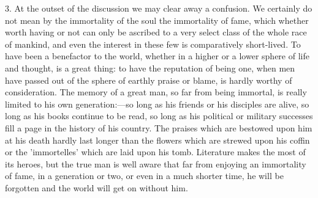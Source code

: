 3. At the outset of the discussion we may clear away a confusion. We
certainly do not mean by the immortality of the soul the immortality of
fame, which whether worth having or not can only be ascribed to a very
select class of the whole race of mankind, and even the interest in these
few is comparatively short-lived. To have been a benefactor to the world,
whether in a higher or a lower sphere of life and thought, is a great
thing: to have the reputation of being one, when men have passed out of
the sphere of earthly praise or blame, is hardly worthy of consideration.
The memory of a great man, so far from being immortal, is really limited
to his own generation:—so long as his friends or his disciples are
alive, so long as his books continue to be read, so long as his political
or military successes fill a page in the history of his country. The
praises which are bestowed upon him at his death hardly last longer than
the flowers which are strewed upon his coffin or the 'immortelles' which
are laid upon his tomb. Literature makes the most of its heroes, but the
true man is well aware that far from enjoying an immortality of fame, in a
generation or two, or even in a much shorter time, he will be forgotten
and the world will get on without him.


